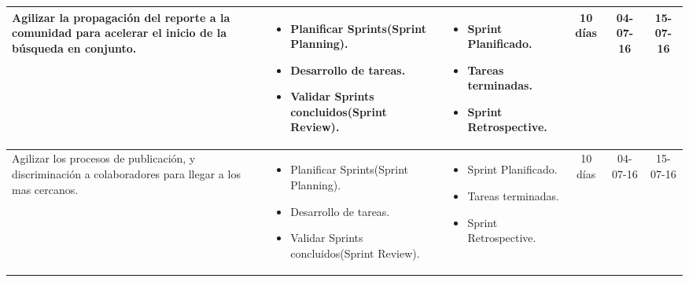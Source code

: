 \documentclass[letter,11pt,oneside,spanish]{article}
\begin{document}
\begin{table}
\centering
\begin{tabular}{|p{3.5cm}|p{3.5cm}|p{3.5cm}|c|c|c|}
	\hline
	Agilizar la propagación del reporte a la comunidad para acelerar el inicio de la búsqueda en conjunto. & \begin{itemize}[leftmargin=*]
	 																					\item Planificar Sprints(Sprint Planning).
																					 	\item Desarrollo de tareas.
																					 	\item Validar Sprints concluidos(Sprint Review).
																					\end{itemize}  	& \begin{itemize}[leftmargin=*]
	 																					\item Sprint Planificado.
																					 	\item Tareas terminadas.
																					 	\item Sprint Retrospective.
																					\end{itemize}  	& 10 días & 04-07-16 & 15-07-16										\\ 
	\hline %
	Agilizar los procesos de publicación, y discriminación a colaboradores para llegar a los mas cercanos. & \begin{itemize}[leftmargin=*]
	 																					\item Planificar Sprints(Sprint Planning).
																					 	\item Desarrollo de tareas.
																					 	\item Validar Sprints concluidos(Sprint Review).
																					\end{itemize}  	& \begin{itemize}[leftmargin=*]
	 																					\item Sprint Planificado.
																					 	\item Tareas terminadas.
																					 	\item Sprint Retrospective.
																					\end{itemize}  	& 10 días & 04-07-16 & 15-07-16										\\ 
	\hline %
\end{tabular}
\end{table}
\end{document}
